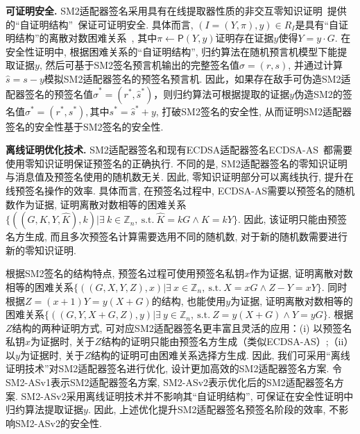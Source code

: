\documentclass[review]{jcr}
\begin{document}
\begin{trivlist}
\item \textbf{可证明安全.} SM2适配器签名采用具有在线提取器性质的非交互零知识证明~\cite{Fischlin05}提供的``自证明结构''~\cite{AumayrEEFHMMR20}保证可证明安全. 具体而言, $(I=(Y,\pi),y)\in R_I$是具有``自证明结构''的离散对数困难关系~\cite{AumayrEEFHMMR20}, 其中$\pi\leftarrow \mathsf{P}(Y,y)$证明存在证据$y$使得$Y=y\cdot G$. 在安全性证明中, 根据困难关系的``自证明结构'',  归约算法在随机预言机模型下能提取证据$y$, 然后可基于SM2签名预言机输出的完整签名值$\sigma=(r,s)$, 并通过计算$\hat{s}=s-y$模拟SM2适配器签名的预签名预言机. 因此，如果存在敌手可伪造SM2适配器签名的预签名值$\hat{\sigma}^*=(r^*,\hat{s}^*)$，则归约算法可根据提取的证据$y$伪造SM2的签名值$\sigma^*=(r^*,s^*), 其中 s^*=\hat{s}^*+y$, 打破SM2签名的安全性, 从而证明SM2适配器签名的安全性基于SM2签名的安全性.
\end{trivlist}

\begin{trivlist}
\item \textbf{离线证明优化技术.} SM2适配器签名和现有ECDSA适配器签名ECDSA-AS~\cite{AumayrEEFHMMR20}都需要使用零知识证明保证预签名的正确执行. 不同的是,  SM2适配器签名的零知识证明与消息值及预签名使用的随机数无关. 因此, 零知识证明部分可以离线执行, 提升在线预签名操作的效率. 具体而言, 在预签名过程中, ECDSA-AS需要以预签名的随机数作为证据, 证明离散对数相等的困难关系$\{((G,K,Y,\hat{K}),k)|\exists\ k\in \mathbb{Z}_n,\ \text{s.t.}\ \hat{K}=kG\wedge K=kY\}$. 因此, 该证明只能由预签名方生成, 而且多次预签名计算需要选用不同的随机数, 对于新的随机数需要进行新的零知识证明. 

根据SM2签名的结构特点, 预签名过程可使用预签名私钥$x$作为证据, 证明离散对数相等的困难关系$\{((G,X,Y,Z),x)|\exists\ x\in \mathbb{Z}_n,\ \text{s.t.}\ X=xG\wedge Z-Y=xY\}$. 同时根据$Z=(x+1)Y=y(X+G)$的结构, 也能使用$y$为证据, 证明离散对数相等的困难关系$\{((G,Y,X+G,Z),y)|\exists\ y\in \mathbb{Z}_n,\ \text{s.t.}\ Z=y(X+G)\wedge Y=yG\}$. 根据$Z$结构的两种证明方式, 可对应SM2适配器签名更丰富且灵活的应用：(i) 以预签名私钥$x$为证据时, 关于$Z$结构的证明只能由预签名方生成（类似ECDSA-AS）;（ii）以$y$为证据时, 关于$Z$结构的证明可由困难关系选择方生成.
因此, 我们可采用``离线证明技术''对SM2适配器签名进行优化, 设计更加高效的SM2适配器签名方案. 令SM2-ASv1表示SM2适配器签名方案, SM2-ASv2表示优化后的SM2适配器签名方案. SM2-ASv2采用离线证明技术并不影响其``自证明结构'', 可保证在安全性证明中归约算法提取证据$y$. 因此, 上述优化提升SM2适配器签名预签名阶段的效率, 不影响SM2-ASv2的安全性.
\end{trivlist}
\end{document}
